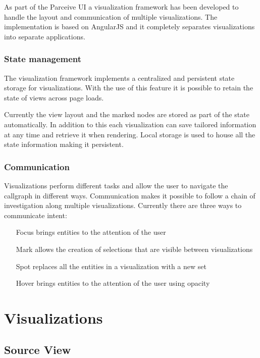 \documentclass[conference]{IEEEtran}
\begin{document}
As part of the Parceive UI a visualization framework has been developed to handle the layout and communication of multiple visualizations. The implementation is based on AngularJS and it completely separates visualizations into separate applications.

\subsubsection{State management}

The visualization framework implements a centralized and persistent state storage for visualizations. With the use of this feature it is possible to retain the state of views across page loads.

Currently the view layout and the marked nodes are stored as part of the state automatically. In addition to this each visualization can save tailored information at any time and retrieve it when rendering. Local storage is used to house all the state information making it persistent.

\subsubsection{Communication}

Visualizations perform different tasks and allow the user to navigate the callgraph in different ways. Communication makes it possible to follow a chain of investigation along multiple visualizations. Currently there are three ways to communicate intent:

\begin{itemize}
	\item[Focus] brings entities to the attention of the user
	\item[Mark] allows the creation of selections that are visible between visualizations
	\item[Spot] replaces all the entities in a visualization with a new set
	\item[Hover] brings entities to the attention of the user using opacity
\end{itemize}


\section{Visualizations}

\subsection{Source View}
\end{document}

